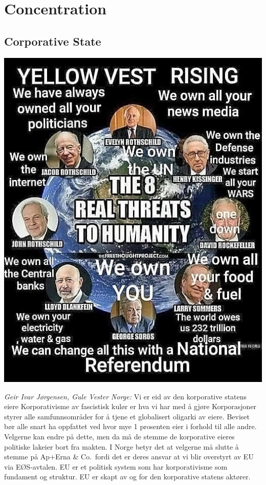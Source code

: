 \documentclass[
]{book}
\begin{document}
\hypertarget{concentration}{%
\chapter{Concentration}\label{concentration}}

\hypertarget{corporative-state}{%
\section{Corporative State}\label{corporative-state}}

\includegraphics{fig/Yellow_West_Rising.jpg}

\emph{Geir Ivar Jørgensen, Gule Vester Norge:}
Vi er eid av den korporative statens eiere
Korporativisme av fascistisk kulør er hva vi har med å gjøre
Korporasjoner styrer alle samfunnsområder for å tjene et globalisert oligarki av eiere.
Beviset bør alle snart ha oppfattet ved hvor mye 1 prosenten eier i forhold til alle andre.
Velgerne kan endre på dette, men da må de stemme de korporative eieres politiske lakeier bort fra makten.
I Norge betyr det at velgerne må slutte å stemme på Ap+Erna \& Co.~fordi det er deres ansvar at vi blir overstyrt av EU via EØS-avtalen. EU er et politisk system som har korporativisme som fundament og struktur. EU er skapt av og for den korporative statens aktører.
\end{document}
